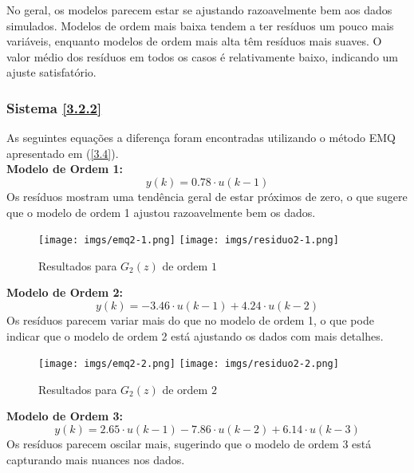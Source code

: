 \documentclass[a4paper,12pt]{article}
\begin{document}
No geral, os modelos parecem estar se ajustando razoavelmente bem aos dados simulados. Modelos de ordem mais baixa tendem a ter resíduos um pouco mais variáveis, enquanto modelos de ordem mais alta têm resíduos mais suaves. O valor médio dos resíduos em todos os casos é relativamente baixo, indicando um ajuste satisfatório.

\subsubsection{Sistema \ref{3.2.2}}

As seguintes equações a diferença foram encontradas utilizando o método EMQ apresentado em (\ref{3.4}).\\

\noindent \textbf{Modelo de Ordem 1:}
\begin{equation*}
   y(k) = 0.78 \cdot u(k-1)\tag{4.4.2.1}
\end{equation*}
Os resíduos mostram uma tendência geral de estar próximos de zero, o que sugere que o modelo de ordem 1 ajustou razoavelmente bem os dados.

\begin{figure}[h!]
\begin{center}
	\texttt{[image: imgs/emq2-1.png]} \quad
	\texttt{[image: imgs/residuo2-1.png]}
\caption{Resultados para $G_2(z)$ de ordem $1$} \label{fig11}
\end{center}
\end{figure}
\newpage
\noindent \textbf{Modelo de Ordem 2:}
\begin{equation*}
    y(k) = -3.46 \cdot u(k-1) + 4.24 \cdot u(k-2)\tag{4.4.2.2}
\end{equation*}
Os resíduos parecem variar mais do que no modelo de ordem 1, o que pode indicar que o modelo de ordem 2 está ajustando os dados com mais detalhes.

\begin{figure}[h!]
\begin{center}
	\texttt{[image: imgs/emq2-2.png]} \quad
	\texttt{[image: imgs/residuo2-2.png]}
\caption{Resultados para $G_2(z)$ de ordem $2$} \label{fig12}
\end{center}
\end{figure}

\noindent \textbf{Modelo de Ordem 3:}
\begin{equation*}
   y(k) = 2.65 \cdot u(k-1) - 7.86 \cdot u(k-2) + 6.14 \cdot u(k-3)\tag{4.4.2.3}
\end{equation*}
Os resíduos parecem oscilar mais, sugerindo que o modelo de ordem 3 está capturando mais nuances nos dados.
\end{document}
